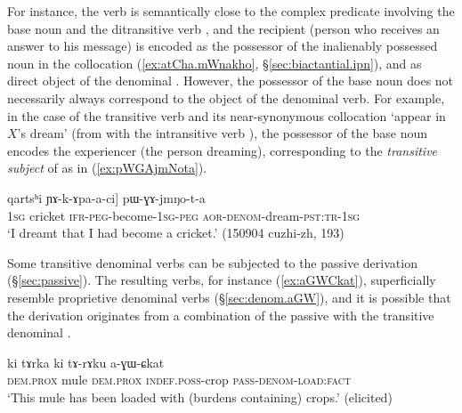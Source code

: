 For instance, the verb   is semantically close to the complex predicate involving the base noun  and the ditransitive verb , and the recipient (person who receives an answer to his message) is encoded as the possessor of the inalienably possessed noun  in the collocation (\ref{ex:atCha.mWnakho}, §\ref{sec:biactantial.ipn}), and as direct object of the denominal . However, the possessor of the base noun does not necessarily always correspond to the object of the  denominal verb. For example, in the case of the transitive verb  and its near-synonymous collocation  `appear in $X$'s dream' (from  with the intransitive verb ), the possessor of the base noun  encodes the  experiencer (the person dreaming), corresponding to the \textit{transitive subject}  of  as in (\ref{ex:pWGAjmNota}). 

\begin{exe}
\ex \label{ex:pWGAjmNota}
 \gll [aʑo [...] qartsʰi ɲɤ-k-ɤpa-a-ci] pɯ-ɣɤ-jmŋo-t-a \\
\textsc{1sg} {  } cricket \textsc{ifr}-\textsc{peg}-become-\textsc{1sg}-\textsc{peg} \textsc{aor}-\textsc{denom}-dream-\textsc{pst}:\textsc{tr}-\textsc{1sg} \\
\glt `I dreamt that I had become a cricket.' (150904 cuzhi-zh, 193)
\end{exe}
 
Some transitive  denominal verbs can be subjected to the  passive derivation (§\ref{sec:passive}). The resulting verbs, for instance   (\ref{ex:aGWCkat}), superficially resemble  proprietive denominal verbs (§\ref{sec:denom.aGW}), and it is possible that the   derivation originates from a combination of the passive with the transitive denominal .
 

\begin{exe}
\ex \label{ex:aGWCkat}
 \gll ki tɤrka ki tɤ-rɤku a-ɣɯ-ɕkat \\
 \textsc{dem}.\textsc{prox} mule  \textsc{dem}.\textsc{prox} \textsc{indef}.\textsc{poss}-crop \textsc{pass}-\textsc{denom}-\textsc{load}:\textsc{fact} \\
 \glt `This mule has been loaded with (burdens containing) crops.' (elicited)
 \end{exe}
 
